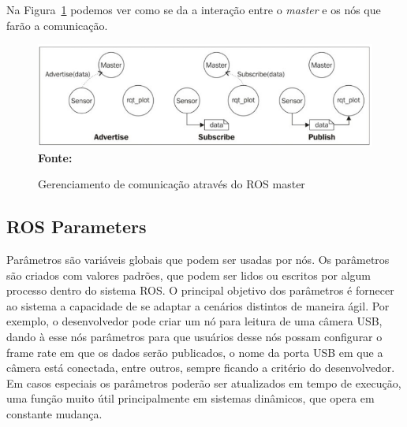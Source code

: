 Na Figura~\ref{fig:rosMastering} podemos ver como se da a interação entre o \textit{master} e os nós que farão a comunicação.


\begin{figure}[ht]
	\caption{Gerenciamento de comunicação através do ROS master}
	\begin{center}
		\includegraphics[scale=0.51]{imagens/rosmaster.png}\\
		{\small \textbf{Fonte:} }
    \end{center}\label{fig:rosMastering}
\end{figure}

\subsection{ROS Parameters}

Parâmetros são variáveis globais que podem ser usadas por nós. Os parâmetros são criados com valores padrões, que podem ser lidos ou escritos por algum processo dentro do sistema ROS\@. O principal objetivo dos parâmetros é fornecer ao sistema a capacidade de se adaptar a cenários distintos de maneira ágil. Por exemplo, o desenvolvedor pode criar um nó para leitura de uma câmera USB, dando à esse nós parâmetros para que usuários desse nós possam configurar o frame rate em que os dados serão publicados, o nome da porta USB em que a câmera está conectada, entre outros, sempre ficando a critério do desenvolvedor. Em casos especiais os parâmetros poderão ser atualizados em tempo de execução, uma função muito útil principalmente em sistemas dinâmicos, que opera em constante mudança.
